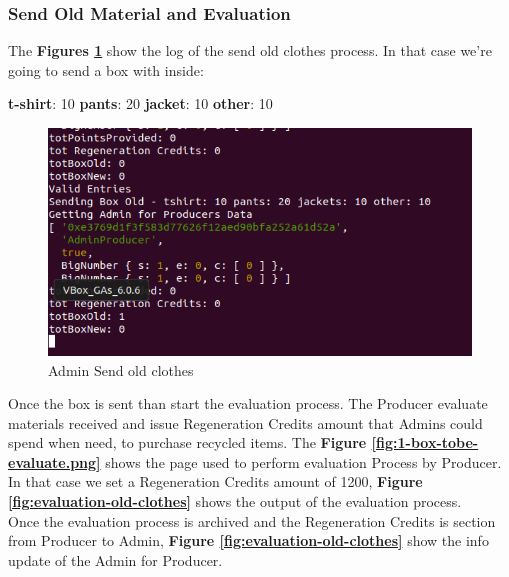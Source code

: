 \subsubsection{Send Old Material and Evaluation}

The \textbf{Figures \ref{fig:send-old-clothes}} show the log of the send old clothes process.
In that case we're going to send a box with inside: 
\begin{outline}
    \1 \textbf{t-shirt}: 10
    \1 \textbf{pants}: 20
    \1 \textbf{jacket}: 10
    \1 \textbf{other}: 10
\end{outline}

\begin{figure}[h!]
	\centering
    \includegraphics[totalheight=6cm]{img/test/usecase2/0-send-old-clothes.png}
	\caption{Admin Send old clothes}
	\label{fig:send-old-clothes}
\end{figure}

Once the box is sent than start the evaluation process. The Producer evaluate materials received
and issue Regeneration Credits amount that Admins could spend when need, to purchase
recycled items. The \textbf{Figure \ref{fig:1-box-tobe-evaluate.png}} shows the page used
to perform evaluation Process by Producer. In that case we set a Regeneration Credits amount
of 1200, \textbf{Figure \ref{fig:evaluation-old-clothes}} shows the output of the evaluation process.
\\
Once the evaluation process is archived and the Regeneration Credits is section
from Producer to Admin, \textbf{Figure \ref{fig:evaluation-old-clothes}} show the info update
of the Admin for Producer.

